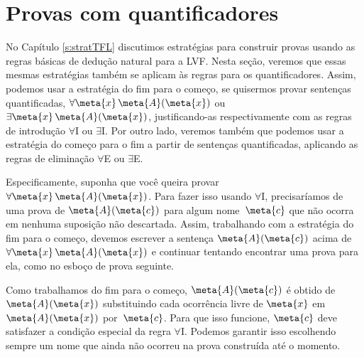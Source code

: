 
\chapter{Provas com quantificadores}

No Capítulo \ref{s:stratTFL}  discutimos estratégias para construir provas usando as regras básicas de dedução natural para a LVF.  Nesta seção, veremos que essas mesmas estratégias também se aplicam às regras para os quantificadores. Assim, podemos usar a estratégia do fim para o começo, se quisermos provar sentenças quantificadas,  $\forall \meta{x}\, \atom{\meta{A}}{\meta{x}}$ ou $\exists \meta{x}\, \atom{\meta{A}}{\meta{x}}$, justificando-as respectivamente com as regras de introdução $\forall$I ou $\exists$I. Por outro lado, veremos também que podemos usar a estratégia do começo para o fim a partir de sentenças quantificadas, aplicando as regras de eliminação $\forall$E ou $\exists$E.

Especificamente, suponha que você queira provar $\forall \meta{x}\, \atom{\meta{A}}{\meta{x}}$. Para fazer isso usando $\forall$I, precisaríamos de uma prova de $\atom{\meta{A}}{\meta{c}}$ para algum nome~$\meta{c}$ que não ocorra em nenhuma suposição não descartada. Assim, trabalhando com a estratégia do fim para o começo, devemos escrever  a sentença $\atom{\meta{A}}{\meta{c}}$ acima de $\forall \meta{x}\, \atom{\meta{A}}{\meta{x}}$ e continuar tentando encontrar uma prova para ela, como no esboço de prova seguinte. 
 
\begin{fitchproof}
	\ellipsesline
\end{fitchproof}
 
Como trabalhamos do fim para o começo,  $\atom{\meta{A}}{\meta{c}}$ é obtido de $\atom{\meta{A}}{\meta{x}}$ substituindo cada ocorrência livre de $\meta{x}$ em $\atom{\meta{A}}{\meta{x}}$ por~$\meta{c}$. Para que isso funcione, $\meta{c}$ deve satisfazer a condição especial da regra $\forall$I. Podemos garantir isso escolhendo sempre um nome que ainda não ocorreu na prova construída até o momento.

